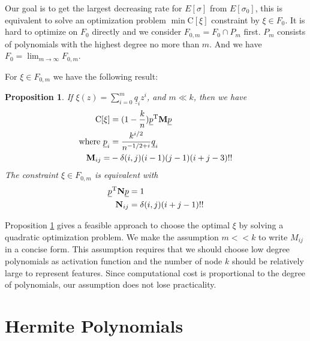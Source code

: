 \documentclass[conference]{IEEEtran}
\newtheorem{proposition}{Proposition}
\def\T{\mathrm{T}}
\begin{document}
Our goal is to get the largest decreasing rate for $E[\sigma]$ from $E[\sigma_0]$, this is equivalent to solve an optimization problem $\min \mathrm{C}[\xi]$ constraint by $\xi \in F_0$. It is hard to optimize on $F_0$ directly and we consider $F_{0,m} = F_0 \cap P_m$ first. $P_m$ consists of polynomials with the highest degree no more than $m$. And we have $F_0 = \lim_{m\to \infty} F_{0,m}$.

For $\xi \in F_{0,m}$ we have the following result:
\begin{proposition}\label{prop:quadratic}
If
$\xi(z) = \sum_{i=0}^m \underline{q}_i z^i$,
and $m \ll k$, then we have 
\begin{align}
\mathrm{C}[\xi] &= (1-\frac{k}{n}) \underline{p}^\T \mathbf{M} \underline{p} \notag\\
\textrm{where }\underline{p}_i &= \frac{k^{i/2}}{n^{- 1/2 + i}}\underline{q}_i\label{eq:pqt} \\
\mathbf{M}_{ij} =& -\delta(i,j)(i-1)(j-1)(i+j-3)!! \notag
\end{align}
The constraint $\xi \in F_{0,m}$ is equivalent with
\begin{align}
\underline{p}^\T \mathbf{N} \underline{p} & = 1 \notag\\
\mathbf{N}_{ij}  & = \delta(i,j)(i+j-1)!!
\end{align}
\end{proposition}

Proposition \ref{prop:quadratic} gives a feasible approach to choose the optimal $\xi$ by solving a quadratic optimization problem. We make the assumption $
m << k$ to write $M_{ij}$ in a concise form. This assumption requires that we should choose low degree polynomials as activation function and the number of node $k$ should be relatively large to represent features. Since computational cost
is proportional to the degree of polynomials, our assumption does not lose practicality. 

\section{Hermite Polynomials}\label{sec:hp}
\end{document}
